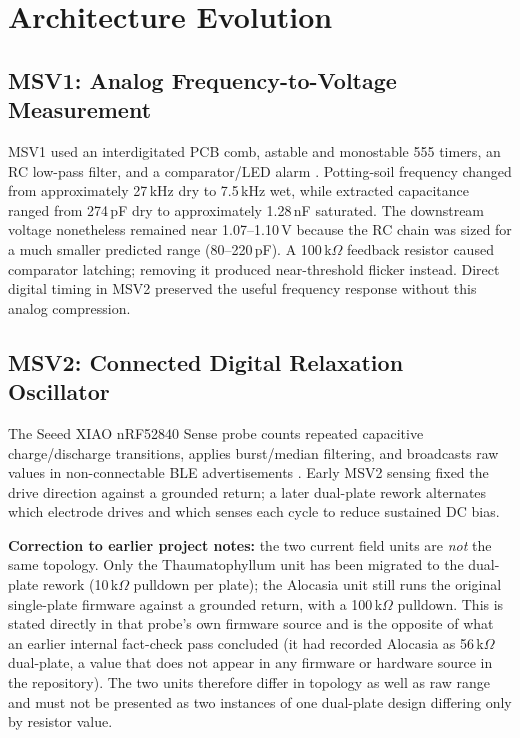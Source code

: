 \documentclass[conference]{IEEEtran}
\begin{document}
\section{Architecture Evolution}

\subsection{MSV1: Analog Frequency-to-Voltage Measurement}
MSV1 used an interdigitated PCB comb, astable and monostable 555 timers, an RC low-pass filter,
and a comparator/LED alarm \cite{amezcua2026msv1}. Potting-soil frequency changed from
approximately 27\,kHz dry to 7.5\,kHz wet, while extracted capacitance ranged from 274\,pF dry to
approximately 1.28\,nF saturated. The downstream voltage nonetheless remained near
1.07--1.10\,V because the RC chain was sized for a much smaller predicted range
(80--220\,pF). A 100\,k$\Omega$ feedback resistor caused comparator latching; removing it
produced near-threshold flicker instead. Direct digital timing in MSV2 preserved the useful
frequency response without this analog compression.

\subsection{MSV2: Connected Digital Relaxation Oscillator}
The Seeed XIAO nRF52840 Sense probe counts repeated capacitive charge/discharge transitions,
applies burst/median filtering, and broadcasts raw values in non-connectable BLE advertisements
\cite{project_oscillator_report}. Early MSV2 sensing fixed the drive direction against a grounded
return; a later dual-plate rework alternates which electrode drives and which senses each cycle to
reduce sustained DC bias.

\textbf{Correction to earlier project notes:} the two current field units are \emph{not} the same
topology. Only the Thaumatophyllum unit has been migrated to the dual-plate rework (10\,k$\Omega$
pulldown per plate); the Alocasia unit still runs the original single-plate firmware against a
grounded return, with a 100\,k$\Omega$ pulldown. This is stated directly in that probe's own
firmware source and is the opposite of what an earlier internal fact-check pass concluded (it had
recorded Alocasia as 56\,k$\Omega$ dual-plate, a value that does not appear in any firmware or
hardware source in the repository). The two units therefore differ in topology as well as raw
range and must not be presented as two instances of one dual-plate design differing only by
resistor value.
\end{document}
